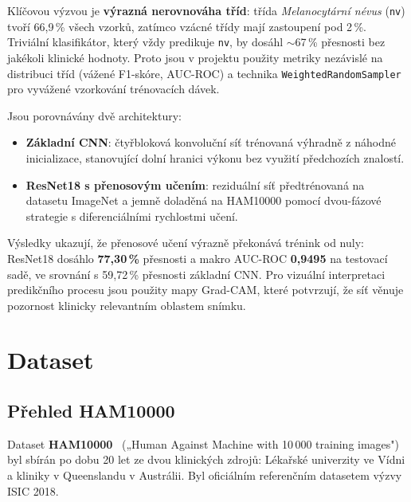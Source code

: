 \documentclass[12pt, a4paper]{article}
\begin{document}
Klíčovou výzvou je \textbf{výrazná nerovnováha tříd}: třída
\textit{Melanocytární névus} (\texttt{nv}) tvoří 66{,}9\,\% všech vzorků,
zatímco vzácné třídy mají zastoupení pod 2\,\%. Triviální klasifikátor,
který vždy predikuje \texttt{nv}, by dosáhl $\sim$67\,\% přesnosti
bez jakékoli klinické hodnoty. Proto jsou v projektu použity metriky
nezávislé na distribuci tříd (vážené F1-skóre, AUC-ROC) a technika
\texttt{WeightedRandomSampler} pro vyvážené vzorkování trénovacích dávek.

Jsou porovnávány dvě architektury:
\begin{itemize}
    \item \textbf{Základní CNN}: čtyřbloková konvoluční síť trénovaná
          výhradně z náhodné inicializace, stanovující dolní hranici výkonu
          bez využití předchozích znalostí.
    \item \textbf{ResNet18 s přenosovým učením}: reziduální síť
          předtrénovaná na datasetu ImageNet
          a jemně doladěná na HAM10000 pomocí dvou-fázové strategie
          s diferenciálními rychlostmi učení.
\end{itemize}

Výsledky ukazují, že přenosové učení výrazně překonává trénink od nuly:
ResNet18 dosáhlo \textbf{77{,}30\,\%} přesnosti a makro AUC-ROC
\textbf{0{,}9495} na testovací sadě, ve srovnání s 59{,}72\,\% přesnosti
základní CNN. Pro vizuální interpretaci predikčního procesu jsou použity
mapy Grad-CAM, které potvrzují, že síť
věnuje pozornost klinicky relevantním oblastem snímku.

\section{Dataset}
\label{sec:dataset}

\subsection{Přehled HAM10000}

Dataset \textbf{HAM10000}~\cite{tschandl2018ham10000}
(„Human Against Machine with 10\,000 training images") byl sbírán po dobu
20 let ze dvou klinických zdrojů: Lékařské univerzity ve Vídni a kliniky
v Queenslandu v Austrálii. Byl oficiálním referenčním datasetem výzvy
ISIC 2018.
\end{document}
